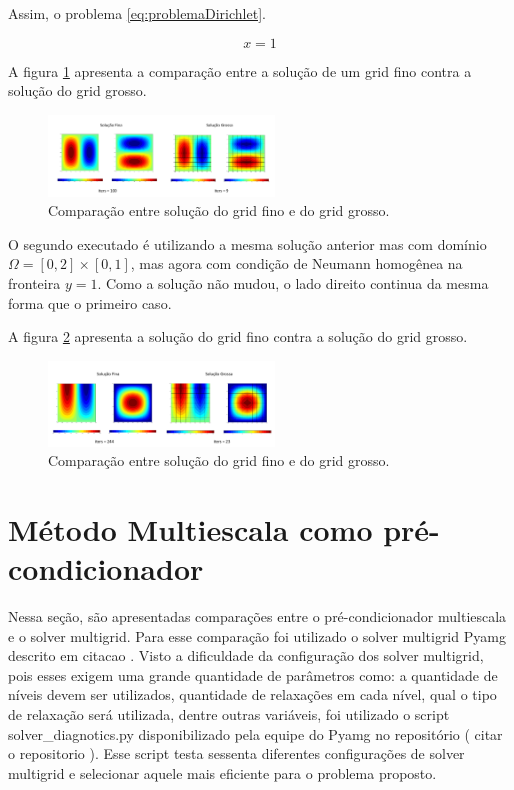 Assim, o problema \ref{eq:problemaDirichlet}.

\begin{equation} \label{eq:problemaDirichlet}
    x = 1
\end{equation}

A figura \ref{fig:DirichletHomogeneo} apresenta a comparação entre a solução de um grid fino contra a solução do grid grosso.  

\begin{figure}[!htbp]
\label{fig:DirichletHomogeneo}
\centering
\includegraphics[width=6cm]{chap08/figs/DirichletHomogeneoTemp.png}
\caption{Comparação entre solução do grid fino e do grid grosso. }
\end{figure}


O segundo executado é utilizando a mesma solução anterior mas com domínio $\Omega = [0, 2] \times [0, 1]$, mas agora com condição de Neumann homogênea na fronteira $y=1$. Como a solução não mudou, o lado direito continua da mesma forma que o primeiro caso.

A figura \ref{fig:NeumannHomogeneo} apresenta a solução do grid fino contra a solução do grid grosso.

\begin{figure}[!htbp]
\label{fig:NeumannHomogeneo}
\centering
\includegraphics[width=6cm]{chap08/figs/NeumannHomogeneoTemp.png}
\caption{Comparação entre solução do grid fino e do grid grosso. }
\end{figure}



\section{Método Multiescala como pré-condicionador}


Nessa seção, são apresentadas comparações entre o pré-condicionador multiescala e o solver multigrid. Para esse comparação foi utilizado o solver multigrid Pyamg descrito em citacao . Visto a dificuldade da configuração dos solver multigrid, pois esses exigem uma grande quantidade de parâmetros como: a quantidade de níveis devem ser utilizados, quantidade de relaxações em cada nível, qual o tipo de relaxação será utilizada, dentre outras variáveis, foi utilizado o script solver\_diagnotics.py disponibilizado pela equipe do Pyamg no repositório ( citar o repositorio ). Esse script testa sessenta diferentes configurações de solver multigrid e selecionar aquele mais eficiente para o problema proposto.

